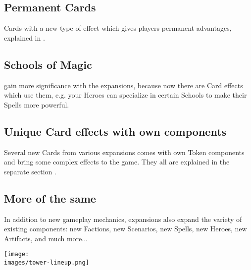 \begin{multicols*}{2}
\subsection*{Permanent Cards}
Cards with a new type of effect which gives players permanent advantages, explained in .

\subsection*{Schools of Magic}
 gain more significance with the expansions, because now there are Card effects which use them, e.g. your Heroes can specialize in certain Schools to make their Spells more powerful.

\subsection*{Unique Card effects with own components}
Several new Cards from various expansions comes with own Token components and bring some complex effects to the game.
They all are explained in the separate section .

\subsection*{More of the same}
In addition to new gameplay mechanics, expansions also expand the variety of existing components: new Factions, new Scenarios, new Spells, new Heroes, new Artifacts, and much more...

\begin{center}
    \texttt{[image: \\images/tower-lineup.png]}
\end{center}
\vspace*{\fill}
\end{multicols*}
\pagebreak

